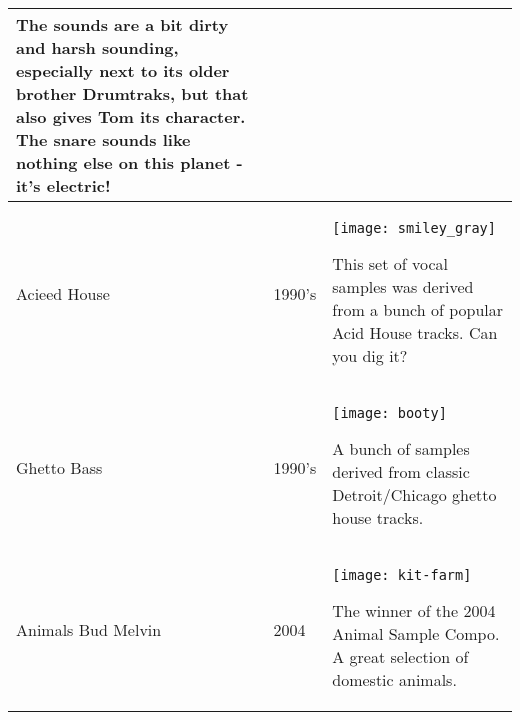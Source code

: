 \begin{xtabular}{p{2.02cm}|l|p{7.8cm}}
The sounds are a bit dirty and harsh sounding, especially next to its older brother Drumtraks, but that also gives Tom its character. The snare sounds like nothing else on this planet - it's electric! \\
\hline
Acieed House & 1990's & 
\texttt{[image: smiley\_gray]}

This set of vocal samples was derived from a bunch of popular Acid House tracks. Can you dig it? \\
\hline
Ghetto Bass & 1990's & 
\texttt{[image: booty]} 

A bunch of samples derived from classic Detroit/Chicago ghetto house tracks.\\
\hline
Animals \linebreak Bud Melvin & 2004 & 
\texttt{[image: kit-farm]} 

The winner of the 2004 Animal Sample Compo. A great selection of domestic animals. \\
\end{xtabular}

